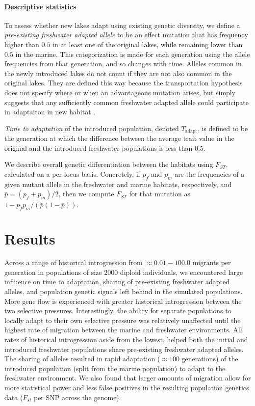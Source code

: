 \documentclass{article}
\begin{document}
\paragraph{Descriptive statistics}
To assess whether new lakes adapt using existing genetic diversity,
we define a \emph{pre-existing freshwater adapted allele}
to be an effect mutation that has frequency higher than $0.5$ in at least one of the original lakes,
while remaining lower than $0.5$ in the marine. 
This categorization is made for each generation using the allele frequencies from that generation,
and so changes with time.
Alleles common in the newly introduced lakes do not count
if they are not also common in the original lakes.
They are defined this way because the transportation hypothesis 
does not specify where or when an advantageous mutation arises,
but simply suggests that any sufficiently common freshwater adapted allele 
could participate in adaptaiton in new habitat \citep{schluter2009genetics}.

\emph{Time to adaptation} of the introduced population, denoted $T_\text{adapt}$, 
is defined to be the generation at which 
the difference between the average trait value in the original and the introduced freshwater populations 
is less than 0.5. 

We describe overall genetic differentiation between the habitats using $F_{ST}$,
calculated on a per-locus basis.
Concretely, if $p_f$ and $p_m$ are the frequencies of a given mutant allele
in the freshwater and marine habitats, respectively,
and $\bar p = (p_f + p_m)/2$,
then we compute $F_{ST}$ for that mutation as $1 - p_f p_m / (\bar p (1-\bar p))$.


\section{Results}

Across a range of historical introgression from $\approx 0.01 - 100.0$ migrants per generation in populations of 
size 2000 diploid individuals, we encountered large influence on 
time to adaptation,
sharing of pre-existing freshwater adapted alleles,
and population genetic signals left behind in the simulated populations.
More gene flow is experienced with greater historical introgression between the two selective pressures.
Interestingly, the ability for separate populations to locally adapt to their own selective pressure was relatively unaffected 
until the highest rate of migration between the marine and freshwater environments.
All rates of historical introgression aside from the lowest, helped both the initial and introduced freshwater populations 
share pre-existing freshwater adapted alleles.
The sharing of alleles resulted in rapid adaptation ($\approx 100$ generations) of the introduced population (split from the marine population) to adapt to the freshwater environment.
We also found that larger amounts of migration allow for more statistical power and less false positives in the resulting population genetics data ($F_{st}$ per SNP across the genome).
\end{document}

